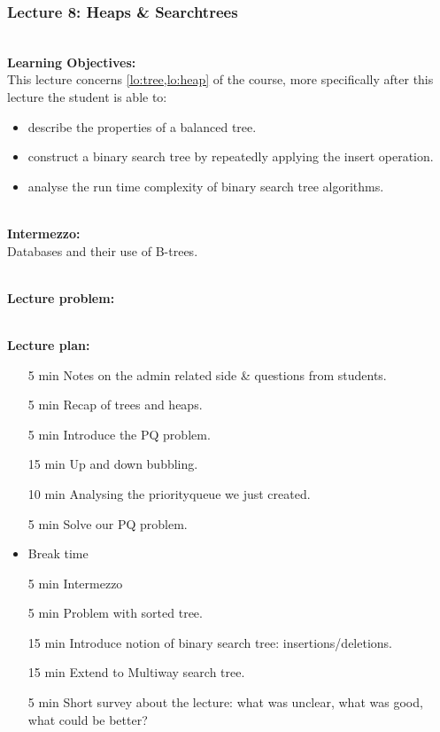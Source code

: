 \newpage
\subsubsection{Lecture 8: Heaps \& Searchtrees}
\label{sub:lecture_8}

\hfill\\
\textbf{Learning Objectives:}\\

This lecture concerns \cref{lo:tree,lo:heap} of the course, more specifically after this lecture the student is able
to:
\begin{itemize}
	\item describe the properties of a balanced tree.
	\item construct a binary search tree by repeatedly applying the insert operation.
	\item analyse the run time complexity of binary search tree algorithms.
\end{itemize}

\hfill\\
\textbf{Intermezzo:}\\
Databases and their use of B-trees.

\hfill\\
\textbf{Lecture problem:}\\

\hfill\\
\textbf{Lecture plan:}\\
\begin{itemize}
	\item[5 min] Notes on the admin related side \& questions from students.
	\item[5 min] Recap of trees and heaps.
	\item[5 min] Introduce the PQ problem.
	\item[15 min] Up and down bubbling.
	\item[10 min] Analysing the priorityqueue we just created.
	\item[5 min] Solve our PQ problem.
	\item Break time
	\item[5 min] Intermezzo
	\item[5 min] Problem with sorted tree.
	\item[15 min] Introduce notion of binary search tree: insertions/deletions.
	\item[15 min] Extend to Multiway search tree.
	\item[5 min] Short survey about the lecture: what was unclear, what was good, what could be better?
\end{itemize}


